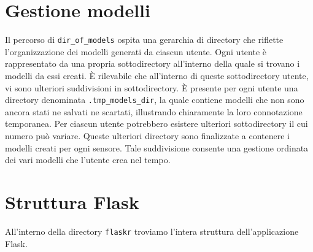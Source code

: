 \documentclass{rapportECL}
\begin{document}
\section{Gestione modelli}
Il percorso di \texttt{dir\_of\_models} ospita una gerarchia di directory che riflette l'organizzazione dei modelli generati da ciascun utente. 
Ogni utente è rappresentato da una propria sottodirectory all'interno della quale si trovano i modelli da essi creati. 
È rilevabile che all'interno di queste sottodirectory utente, vi sono ulteriori suddivisioni in sottodirectory. È presente per ogni utente
una directory denominata \texttt{.tmp\_models\_dir}, la quale contiene modelli che non sono ancora stati ne salvati ne scartati, illustrando chiaramente
la loro connotazione temporanea. Per ciascun utente potrebbero esistere ulteriori sottodirectory il cui numero può variare.
Queste ulteriori directory sono finalizzate a contenere i modelli creati per ogni sensore.
Tale suddivisione consente una gestione ordinata dei vari modelli che l'utente crea nel tempo.

\section{Struttura Flask}
All'interno della directory \texttt{flaskr} troviamo l'intera struttura dell'applicazione Flask.
\end{document}
